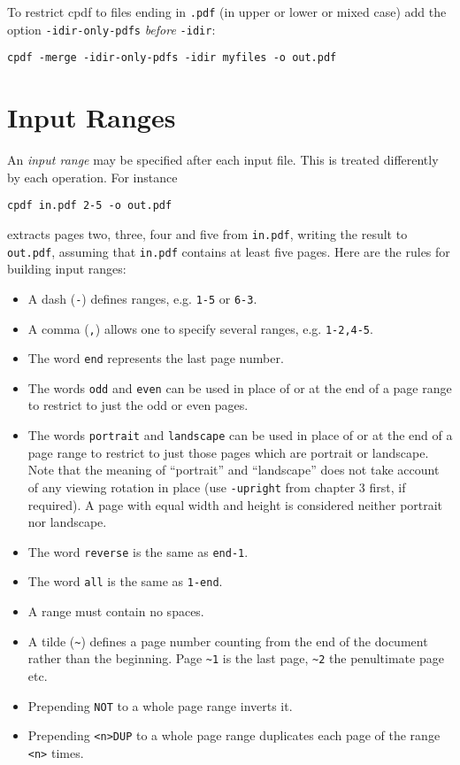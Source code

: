 \documentclass{book}
\begin{document}
To restrict cpdf to files ending in \texttt{.pdf} (in upper or lower or mixed case) add the option \texttt{-idir-only-pdfs} \textit{before} \texttt{-idir}:
  \begin{framed}
  \small\verb!cpdf -merge -idir-only-pdfs -idir myfiles -o out.pdf!
  \end{framed}


  \section{Input Ranges}
  An   \textit{input range} may be specified
after each input file. This is treated differently by each operation. For
instance
  \begin{framed}
  \small\verb!cpdf in.pdf 2-5 -o out.pdf!
  \end{framed}
  \noindent extracts pages two, three, four and five from \texttt{in.pdf},
writing the result to \texttt{out.pdf}, assuming that \texttt{in.pdf} contains
at least five pages.
  Here are the rules for building input ranges:
  \begin{itemize}
    \item A dash (\texttt{-}) defines ranges, e.g. \texttt{1-5} or \texttt{6-3}.
    \item A comma (\texttt{,}) allows one to specify several ranges, e.g. \texttt{1-2,4-5}.
    \item The word \texttt{end} represents the last page number.
    \item The words \texttt{odd} and \texttt{even} can be used in place of or at the end of a page range to restrict to just the odd or even pages.
    \item The words \texttt{portrait} and \texttt{landscape} can be used in place of or at the end of a page range to restrict to just those pages which are portrait or landscape. Note that the meaning of ``portrait'' and ``landscape'' does not take account of any viewing rotation in place (use \texttt{-upright} from chapter 3 first, if required). A page with equal width and height is considered neither portrait nor landscape.
    \item The word \texttt{reverse} is the same as \texttt{end-1}.
    \item The word \texttt{all} is the same as \texttt{1-end}.
    \item A range must contain no spaces.
    \item A tilde (\texttt{\~{}}) defines a page number counting from the end of the document rather than the beginning. Page \texttt{\~{}1} is the last page, \texttt{\~{}2} the penultimate page etc.
    \item Prepending \texttt{NOT} to a whole page range inverts it. 
    \item Prepending \verb!<n>!\texttt{DUP} to a whole page range duplicates each page of the range \verb!<n>! times.
  \end{itemize}
 
\end{document}
